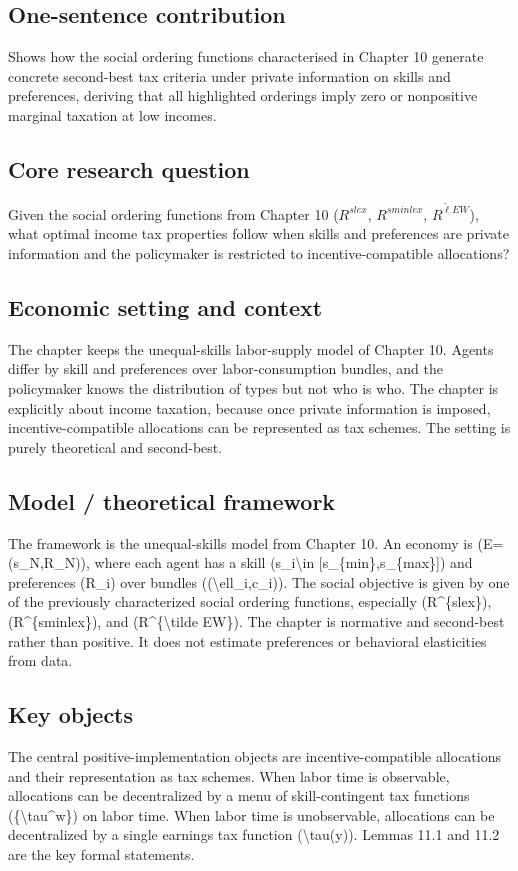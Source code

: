 \documentclass[11pt,a4paper]{article}
\begin{document}
\subsection*{One-sentence contribution}
Shows how the social ordering functions characterised in Chapter 10 generate concrete second-best tax criteria under private information on skills and preferences, deriving that all highlighted orderings imply zero or nonpositive marginal taxation at low incomes.

\subsection*{Core research question}
Given the social ordering functions from Chapter 10 ($R^{slex}$, $R^{sminlex}$, $R^{\tilde{\ell}EW}$), what optimal income tax properties follow when skills and preferences are private information and the policymaker is restricted to incentive-compatible allocations?

\subsection*{Economic setting and context}
The chapter keeps the unequal-skills labor-supply model of Chapter 10. Agents differ by skill and preferences over labor-consumption bundles, and the policymaker knows the distribution of types but not who is who. The chapter is explicitly about income taxation, because once private information is imposed, incentive-compatible allocations can be represented as tax schemes. The setting is purely theoretical and second-best.

\subsection*{Model / theoretical framework}
The framework is the unequal-skills model from Chapter 10. An economy is (E=(s\_N,R\_N)), where each agent has a skill (s\_i\textbackslash{}in [s\_\{min\},s\_\{max\}]) and preferences (R\_i) over bundles ((\textbackslash{}ell\_i,c\_i)). The social objective is given by one of the previously characterized social ordering functions, especially (R\textasciicircum{}\{slex\}), (R\textasciicircum{}\{sminlex\}), and (R\textasciicircum{}\{\textbackslash{}tilde EW\}). The chapter is normative and second-best rather than positive. It does not estimate preferences or behavioral elasticities from data.

\subsection*{Key objects}
The central positive-implementation objects are incentive-compatible allocations and their representation as tax schemes. When labor time is observable, allocations can be decentralized by a menu of skill-contingent tax functions (\{\textbackslash{}tau\textasciicircum{}w\}) on labor time. When labor time is unobservable, allocations can be decentralized by a single earnings tax function (\textbackslash{}tau(y)). Lemmas 11.1 and 11.2 are the key formal statements.
\end{document}
